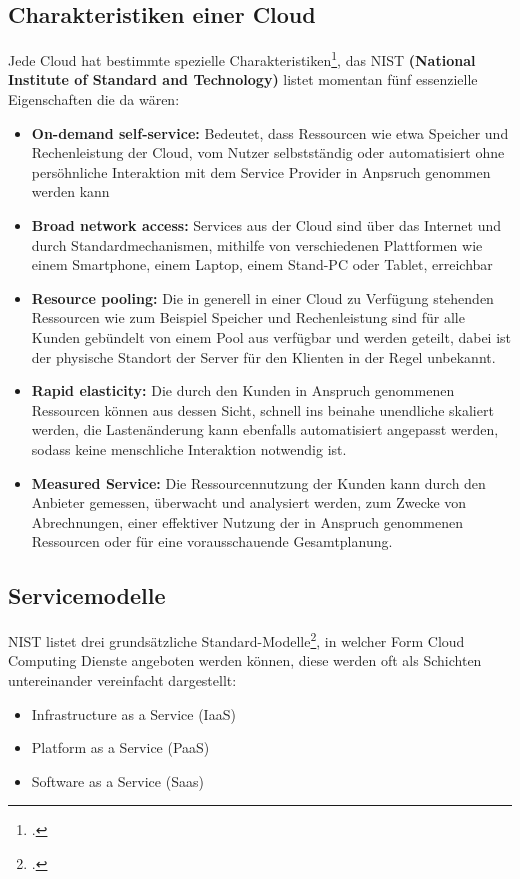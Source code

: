\subsection{Charakteristiken einer Cloud}
Jede Cloud hat bestimmte spezielle Charakteristiken\footcite{cloud-computing}, das NIST \textbf{(National Institute of Standard and Technology)} listet
momentan fünf essenzielle Eigenschaften die da wären:
\begin{itemize}
	\item \textbf{On-demand self-service: } Bedeutet, dass Ressourcen wie etwa Speicher und Rechenleistung der Cloud, vom Nutzer selbstständig oder automatisiert 
ohne persöhnliche Interaktion mit dem Service Provider in Anpsruch genommen werden kann
	\item \textbf{Broad network access: } Services aus der Cloud sind über das Internet und durch Standardmechanismen, mithilfe von verschiedenen Plattformen wie einem Smartphone, einem Laptop, einem Stand-PC oder Tablet, erreichbar
	\item \textbf{Resource pooling: } Die in generell in einer Cloud zu Verfügung stehenden Ressourcen wie zum Beispiel Speicher und Rechenleistung sind für alle Kunden gebündelt von einem Pool aus verfügbar und werden geteilt, dabei ist der physische Standort der Server für den Klienten in der Regel unbekannt.
	\item \textbf{Rapid elasticity: } Die durch den Kunden in Anspruch genommenen Ressourcen können aus dessen Sicht, schnell ins beinahe unendliche skaliert werden, die Lastenänderung
kann ebenfalls automatisiert angepasst werden, sodass keine menschliche Interaktion notwendig ist.
	\item \textbf{Measured Service: } Die Ressourcennutzung der Kunden kann durch den Anbieter gemessen, überwacht und analysiert werden, zum Zwecke von Abrechnungen, einer effektiver
Nutzung der in Anspruch genommenen Ressourcen oder für eine vorausschauende Gesamtplanung.
\end{itemize}

\subsection{Servicemodelle}
NIST listet drei grundsätzliche Standard-Modelle\footcite{cloud-servicemodelle}, in welcher Form Cloud Computing Dienste angeboten werden können, diese werden oft als Schichten untereinander vereinfacht dargestellt:
\begin{itemize}
	\item Infrastructure as a Service (IaaS)
	\item Platform as a Service (PaaS)
	\item Software as a Service (Saas)
\end{itemize}

